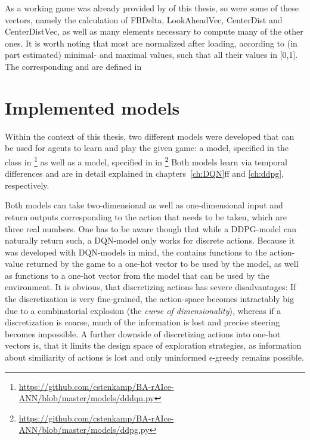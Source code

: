 As a working game was already provided by \leon of this thesis, so were some of these vectors, namely the calculation of FBDelta, LookAheadVec, CenterDist and CenterDistVec, as well as many elements necessary to compute many of the other ones. 
It is worth noting that most  are normalized after loading, according to (in part estimated) minimal- and maximal values, such that all their values in [0,1]. The corresponding  and  are defined in 

\section{Implemented models}

Within the context of this thesis, two different models were developed that can be used for agents to learn and play the given game: a  model, specified in the class  in \footnote{\url{https://github.com/cstenkamp/BA-rAIce-ANN/blob/master/models/dddqn.py}} as well as a  model, specified in  in \footnote{\url{https://github.com/cstenkamp/BA-rAIce-ANN/blob/master/models/ddpg.py}} Both models learn via temporal differences and are in detail explained in chapters~\ref{ch:DQN}ff and \ref{ch:ddpg}, respectively. 

Both models can take two-dimensional as well as one-dimensional input and return outputs corresponding to the action that needs to be taken, which are three real numbers. One has to be aware though that while a DDPG-model can naturally return such, a DQN-model only works for discrete actions. Because it was developed with DQN-models in mind, the  contains functions to  the action-value returned by the game to a one-hot vector to be used by the model, as well as functions to  a one-hot vector from the model that can be used by the environment. It is obvious, that discretizing actions has severe disadvantages: If the discretization is very fine-grained, the action-space becomes intractably big due to a combinatorial explosion (the \textit{curse of dimensionality}), whereas if a discretization is coarse, much of the information is lost and precise steering becomes impossible. A further downside of discretizing actions into one-hot vectors is, that it limits the design space of exploration strategies, as information about similiarity of actions is lost and only uninformed $\epsilon$-greedy remains possible.

